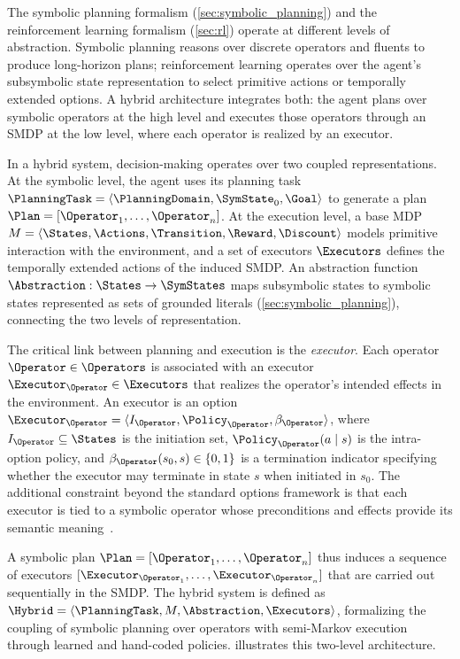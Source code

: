 The symbolic planning formalism (\cref{sec:symbolic_planning}) and the reinforcement learning formalism (\cref{sec:rl}) operate at different levels of abstraction. Symbolic planning reasons over discrete operators and fluents to produce long-horizon plans; reinforcement learning operates over the agent's subsymbolic state representation to select primitive actions or temporally extended options. A hybrid architecture integrates both: the agent plans over symbolic operators at the high level and executes those operators through an SMDP at the low level, where each operator is realized by an executor.

In a hybrid system, decision-making operates over two coupled representations. At the symbolic level, the agent uses its planning task $\PlanningTask = \langle \PlanningDomain, \SymState_0, \Goal \rangle$ to generate a plan $\Plan = [\Operator_1, \dots, \Operator_n]$. At the execution level, a base MDP $M = \langle \States, \Actions, \Transition, \Reward, \Discount \rangle$ models primitive interaction with the environment, and a set of executors $\Executors$ defines the temporally extended actions of the induced SMDP. An abstraction function $\Abstraction : \States \rightarrow \SymStates$ maps subsymbolic states to symbolic states represented as sets of grounded literals (\cref{sec:symbolic_planning}), connecting the two levels of representation.

The critical link between planning and execution is the \emph{executor}. Each operator $\Operator \in \Operators$ is associated with an executor $\Executor_\Operator \in \Executors$ that realizes the operator's intended effects in the environment. An executor is an option $\Executor_\Operator = \langle I_\Operator, \Policy_\Operator, \beta_\Operator \rangle$, where $I_\Operator \subseteq \States$ is the initiation set, $\Policy_\Operator(a \mid s)$ is the intra-option policy, and $\beta_\Operator(s_0, s) \in \{0, 1\}$ is a termination indicator specifying whether the executor may terminate in state $s$ when initiated in $s_0$. The additional constraint beyond the standard options framework is that each executor is tied to a symbolic operator whose preconditions and effects provide its semantic meaning~\citep{goel2022rapidlearn}.

A symbolic plan $\Plan = [\Operator_1, \dots, \Operator_n]$ thus induces a sequence of executors $[\Executor_{\Operator_1}, \dots, \Executor_{\Operator_n}]$ that are carried out sequentially in the SMDP. The hybrid system is defined as $\Hybrid = \langle \PlanningTask, M, \Abstraction, \Executors \rangle$, formalizing the coupling of symbolic planning over operators with semi-Markov execution through learned and hand-coded policies.  illustrates this two-level architecture.

